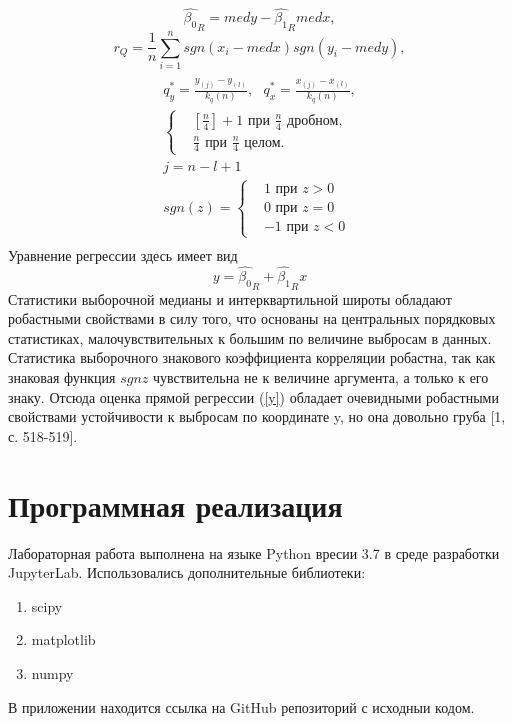 \documentclass{article}
\begin{document}
    \begin{equation}
        \hat{\beta_{0}}_{R} = med y - \hat{\beta_{1}}_{R} med x,
        \label{b_0R}
    \end{equation}
    \begin{equation}
        r_{Q} = \frac{1}{n}\sum_{i=1}^{n}{sgn(x_{i} - med x)sgn(y_{i} - med y)},
        \label{r_Q}
    \end{equation}
    \begin{multline}
    \\
        q^{*}_{y} = \frac{y_{(j)} -y_{(l)}}{k_{q}(n)},~~~
        q^{*}_{x} = \frac{x_{(j)} - x_{(l)}}{k_{q}(n)}, \\ 
        \begin{cases}
             & [\frac{n}{4}] + 1 \text{ при } \frac{n}{4} \text{ дробном, } \\ 
             & \frac{n}{4} \text{ при } \frac{n}{4} \text{ целом. }
        \end{cases}\\
        j = n - l + 1\\
        sgn(z) = \begin{cases}
                    & 1 \text{ при } z > 0 \\ 
                    & 0 \text{ при } z = 0 \\
                    & -1 \text{ при } z < 0
                 \end{cases}\\
        \label{q*}        
    \end{multline}
    Уравнение регрессии здесь имеет вид 
    \begin{equation}
        y = \hat{\beta_{0}}_{R} +  \hat{\beta_{1}}_{R}x
        \label{y}
    \end{equation}
    Статистики выборочной медианы и интерквартильной широты обладают робастными свойствами в силу того, что основаны на центральных порядковых статистиках, малочувствительных к большим по величине выбросам в данных. Статистика выборочного знакового коэффициента корреляции робастна, так как знаковая функция $sgn z$ чувствительна не к величине аргумента, а только к его знаку. Отсюда оценка прямой регрессии (\ref{y}) обладает очевидными робастными свойствами устойчивости к выбросам по координате y, но она довольно груба [1, с. 518-519].
    
    \section{Программная реализация}
    \noindent Лабораторная работа выполнена на языке Python вресии 3.7 в среде разработки JupyterLab. Использовались дополнительные библиотеки:
 \begin{enumerate}
        \item scipy
        \item matplotlib
        \item numpy 
    \end{enumerate}
В приложении находится ссылка на GitHub репозиторий с исходныи кодом.
\end{document}

